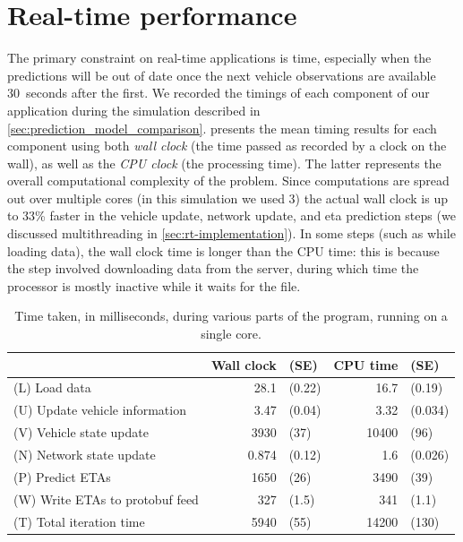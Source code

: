 \section{Real-time performance}
\label{sec:prediction_performance}

The primary constraint on real-time applications is time, especially when the predictions will be out of date once the next vehicle observations are available 30~seconds after the first. We recorded the timings of each component of our application during the simulation described in \cref{sec:prediction_model_comparison}.  presents the mean timing results for each component using both \emph{wall clock} (the time passed as recorded by a clock on the wall), as well as the \emph{CPU clock} (the processing time). The latter represents the overall computational complexity of the problem. Since computations are spread out over multiple cores (in this simulation we used 3)  the actual wall clock is up to 33\% faster in the vehicle update, network update, and \gls{eta} prediction steps (we discussed multithreading in \cref{sec:rt-implementation}). In some steps (such as while loading data), the wall clock time is longer than the CPU time: this is because the step involved downloading data from the server, during which time the processor is mostly inactive while it waits for the file.



\begin{knitrout}\small
{}\color{fgcolor}\begin{table}

\caption{\label{tab:prediction_timing}Time taken, in milliseconds, during various parts of the program, running on a single core.}
\centering
\fontsize{8}{10}\selectfont
\begin{tabular}[t]{lrlrl}
\toprule
 & Wall clock & (SE) & CPU time & (SE)\\
\midrule
(L) Load data & 28.1 & (0.22) & 16.7 & (0.19)\\
(U) Update vehicle information & 3.47 & (0.04) & 3.32 & (0.034)\\
(V) Vehicle state update & 3930 & (37) & 10400 & (96)\\
(N) Network state update & 0.874 & (0.12) & 1.6 & (0.026)\\
(P) Predict ETAs & 1650 & (26) & 3490 & (39)\\
\addlinespace
(W) Write ETAs to protobuf feed & 327 & (1.5) & 341 & (1.1)\\
\midrule
(T) Total iteration time & 5940 & (55) & 14200 & (130)\\
\bottomrule
\end{tabular}
\end{table}


\end{knitrout}



